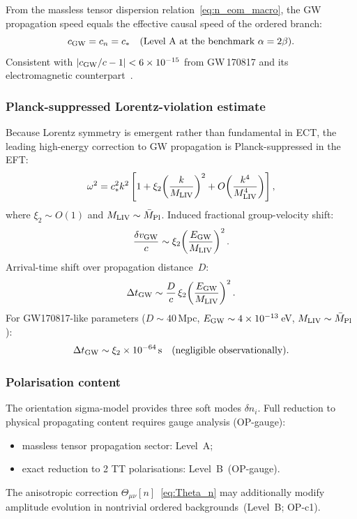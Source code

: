 From the massless tensor dispersion relation~\eqref{eq:n_eom_macro},
the GW propagation speed equals the effective causal speed of the
ordered branch:
\begin{equation}
  \label{eq:cgw}
  c_{\rm GW}=c_n=c_*
  \quad\text{(Level~A at the benchmark }\alpha=2\beta\text{)}.
\end{equation}
Consistent with $|c_{\rm GW}/c-1|<6\times10^{-15}$ from GW\,170817
and its electromagnetic counterpart~\cite{LIGO_Virgo_GW170817_2017}.

\subsubsection*{Planck-suppressed Lorentz-violation estimate}

Because Lorentz symmetry is emergent rather than fundamental in ECT,
the leading high-energy correction to GW propagation is
Planck-suppressed in the EFT:
\begin{equation}
  \label{eq:gw_liv_dispersion}
  \omega^2 = c_*^2 k^2
  \left[1+\xi_2\!\left(\frac{k}{M_{\rm LIV}}\right)^2
  + O\!\left(\frac{k^4}{M_{\rm LIV}^4}\right)\right],
\end{equation}
where $\xi_2\sim O(1)$ and $M_{\rm LIV}\sim\bar M_{\rm Pl}$.
Induced fractional group-velocity shift:
\begin{equation}
  \label{eq:gw_velocity_shift}
  \frac{\delta v_{\rm GW}}{c}
  \sim \xi_2\!\left(\frac{E_{\rm GW}}{M_{\rm LIV}}\right)^2.
\end{equation}
Arrival-time shift over propagation distance~$D$:
\begin{equation}
  \label{eq:LIV_gw}
  \Delta t_{\rm GW}
  \sim \frac{D}{c}\,\xi_2
    \!\left(\frac{E_{\rm GW}}{M_{\rm LIV}}\right)^2.
\end{equation}
For GW170817-like parameters ($D\sim40$\,Mpc,
$E_{\rm GW}\sim4\times10^{-13}$\,eV,
$M_{\rm LIV}\sim\bar M_{\rm Pl}$):
\begin{equation}
  \label{eq:gw_liv_numeric}
  \Delta t_{\rm GW}\sim\xi_2\times10^{-64}\,\text{s}
  \quad\text{(negligible observationally)}.
\end{equation}

\subsubsection*{Polarisation content}

The orientation sigma-model provides three soft modes $\delta n_i$.
Full reduction to physical propagating content requires gauge analysis
(OP-gauge):
\begin{itemize}
  \item massless tensor propagation sector: Level~A;
  \item exact reduction to 2 TT polarisations: Level~B~(OP-gauge).
\end{itemize}
The anisotropic correction $\Theta_{\mu\nu}[n]$~\eqref{eq:Theta_n}
may additionally modify amplitude evolution in nontrivial ordered
backgrounds~(Level~B; OP-c1).

